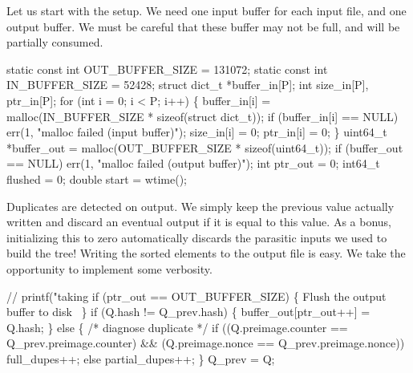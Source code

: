 \documentclass{article}%
\begin{document}
\nwendcode{}Let us start with the setup. We need one input buffer for each input file,
and one output buffer. We must be careful that these buffer may not be full,
and will be partially consumed.

\nwenddocs{}\endmoddef\nwstartdeflinemarkup{}\nwenddeflinemarkup
static const int OUT_BUFFER_SIZE = 131072;
static const int IN_BUFFER_SIZE = 52428;
struct dict_t *buffer_in[P];
int size_in[P], ptr_in[P];
for (int i = 0; i < P; i++) \{
        buffer_in[i] = malloc(IN_BUFFER_SIZE * sizeof(struct dict_t));
        if (buffer_in[i] == NULL)
                err(1, "malloc failed (input buffer)");
        size_in[i] = 0;
        ptr_in[i] = 0;
\}
uint64_t *buffer_out = malloc(OUT_BUFFER_SIZE * sizeof(uint64_t));
if (buffer_out == NULL)
        err(1, "malloc failed (output buffer)");
int ptr_out = 0;
int64_t flushed = 0;
double start = wtime();

\nwendcode{}Duplicates are detected on output. We simply keep the previous value
actually written and discard an eventual output if it is equal to this value.
As a bonus, initializing this to zero automatically discards the parasitic
inputs we used to build the tree! Writing the sorted elements to the output
file is easy. We take the opportunity to implement some verbosity.

\nwenddocs{}\endmoddef\nwstartdeflinemarkup{}\nwenddeflinemarkup
// printf("taking %
if (ptr_out == OUT_BUFFER_SIZE) \{
        \LA{}Flush the output buffer to disk~{\nwtagstyle{}}\RA{}
\}
if (Q.hash != Q_prev.hash) \{
        buffer_out[ptr_out++] = Q.hash;
\} else \{
        /* diagnose duplicate */
        if ((Q.preimage.counter == Q_prev.preimage.counter) && (Q.preimage.nonce == Q_prev.preimage.nonce))
                full_dupes++;
        else
                partial_dupes++;
\}
Q_prev = Q;
\end{document}
